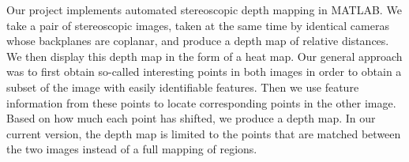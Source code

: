 Our project implements automated stereoscopic depth mapping in MATLAB.  We take a pair of stereoscopic images, taken at the same time by identical cameras whose backplanes are coplanar, and produce a depth map of relative distances. We then display this depth map in the form of a heat map.  Our general approach was to first obtain so-called interesting points in both images in order to obtain a subset of the image with easily identifiable features.  Then we use feature information from these points to locate corresponding points in the other image. Based on how much each point has shifted, we produce a depth map. In our current version, the depth map is limited to the points that are matched between the two images instead of a full mapping of regions.
